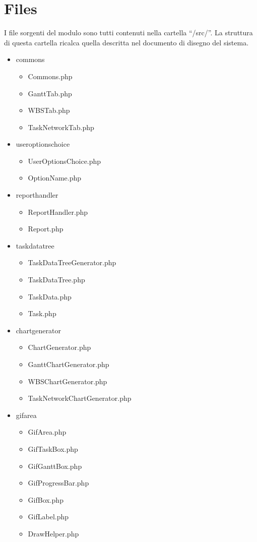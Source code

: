 \section{Files}
I file sorgenti del modulo sono tutti contenuti nella cartella ``/src/''. La struttura di questa cartella ricalca quella descritta nel documento di disegno del sistema.
\begin{itemize}
	\item commons
		\begin{itemize}
			\item Commons.php
			\item GanttTab.php
			\item WBSTab.php
			\item TaskNetworkTab.php
		\end{itemize}
	\item useroptionschoice
		\begin{itemize}
			\item UserOptionsChoice.php
			\item OptionName.php
		\end{itemize}
	\item reporthandler
		\begin{itemize}
			\item ReportHandler.php
			\item Report.php
		\end{itemize}
	\item taskdatatree
		\begin{itemize}
			\item TaskDataTreeGenerator.php
			\item TaskDataTree.php
			\item TaskData.php
			\item Task.php
		\end{itemize}
	\item chartgenerator
		\begin{itemize}
			\item ChartGenerator.php
			\item GanttChartGenerator.php
			\item WBSChartGenerator.php
			\item TaskNetworkChartGenerator.php
		\end{itemize}
	\item gifarea
		\begin{itemize}
			\item GifArea.php
			\item GifTaskBox.php
			\item GifGanttBox.php
			\item GifProgressBar.php
			\item GifBox.php
			\item GifLabel.php
			\item DrawHelper.php
		\end{itemize}
\end{itemize}
